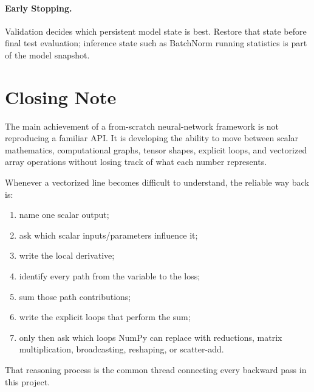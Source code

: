 \documentclass[11pt,a4paper]{article}
\begin{document}
\paragraph{Early Stopping.}
Validation decides which persistent model state is best. Restore that state before final test evaluation; inference state such as BatchNorm running statistics is part of the model snapshot.

\section*{Closing Note}

The main achievement of a from-scratch neural-network framework is not reproducing a familiar API. It is developing the ability to move between scalar mathematics, computational graphs, tensor shapes, explicit loops, and vectorized array operations without losing track of what each number represents.

Whenever a vectorized line becomes difficult to understand, the reliable way back is:
\begin{enumerate}[leftmargin=2em]
    \item name one scalar output;
    \item ask which scalar inputs/parameters influence it;
    \item write the local derivative;
    \item identify every path from the variable to the loss;
    \item sum those path contributions;
    \item write the explicit loops that perform the sum;
    \item only then ask which loops NumPy can replace with reductions, matrix multiplication, broadcasting, reshaping, or scatter-add.
\end{enumerate}

That reasoning process is the common thread connecting every backward pass in this project.
\end{document}
